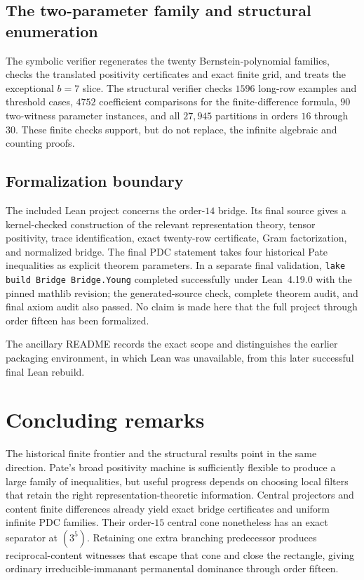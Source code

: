 \documentclass[11pt]{article}
\theoremstyle{definition}
\begin{document}
\subsection{The two-parameter family and structural enumeration}
The symbolic verifier regenerates the twenty Bernstein-polynomial families, checks the translated positivity certificates and exact finite grid, and treats the exceptional $b=7$ slice.  The structural verifier checks $1596$ long-row examples and threshold cases, $4752$ coefficient comparisons for the finite-difference formula, $90$ two-witness parameter instances, and all $27,945$ partitions in orders $16$ through $30$.  These finite checks support, but do not replace, the infinite algebraic and counting proofs.

\subsection{Formalization boundary}
The included Lean project concerns the order-$14$ bridge.  Its final source gives a kernel-checked construction of the relevant representation theory, tensor positivity, trace identification, exact twenty-row certificate, Gram factorization, and normalized bridge.  The final PDC statement takes four historical Pate inequalities as explicit theorem parameters.  In a separate final validation, \texttt{lake build Bridge Bridge.Young} completed successfully under Lean~4.19.0 with the pinned mathlib revision; the generated-source check, complete theorem audit, and final axiom audit also passed.  No claim is made here that the full project through order fifteen has been formalized.

The ancillary README records the exact scope and distinguishes the earlier packaging environment, in which Lean was unavailable, from this later successful final Lean rebuild.

\section{Concluding remarks}\label{sec:conclusion}
The historical finite frontier and the structural results point in the same direction.  Pate's broad positivity machine is sufficiently flexible to produce a large family of inequalities, but useful progress depends on choosing local filters that retain the right representation-theoretic information.  Central projectors and content finite differences already yield exact bridge certificates and uniform infinite PDC families.  Their order-$15$ central cone nonetheless has an exact separator at $(3^5)$.  Retaining one extra branching predecessor produces reciprocal-content witnesses that escape that cone and close the rectangle, giving ordinary irreducible-immanant permanental dominance through order fifteen.
\end{document}
